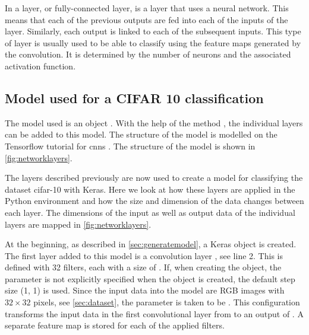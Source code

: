 {In a layer, or fully-connected layer, is a layer that uses a neural network. This means that each of the previous outputs are fed into each of the inputs of the layer. Similarly, each output is linked to each of the subsequent inputs. This type of layer is usually used to be able to classify using the feature maps generated by the convolution.  \cite{Keras:2020b} It is determined by the number of neurons and the associated activation function.



\subsection{Model used for a CIFAR 10 classification}\label{sec:usedmodel}

The model used is an object . With the help of the method , the individual layers can be added to this model. The structure of the model is modelled on the Tensorflow tutorial for \acp{cnn} \cite{GoogleTensorFlowCNN:2020}. The structure of the model is shown in \cref{fig:networklayers}.

The layers described previously are now used to create a model for classifying the dataset \ac{cifar}-10 with Keras. Here we look at how these layers are applied in the Python environment and how the size and dimension of the data changes between each layer. The dimensions of the input as well as output data of the individual layers are mapped in \cref{fig:networklayers}.


At the beginning, as described in \cref{sec:generatemodel}, a Keras object  is created. The first layer added to this model is a convolution layer , see line 2. This is defined with 32 filters, each with a size of . If, when creating the object, the parameter  is not explicitly specified when the object is created, the default step size (1, 1) is used. Since the input data into the model are RGB images with $32 \times 32$ pixels, see \cref{sec:dataset}, the parameter  is taken to be . This configuration transforms the input data in the first convolutional layer from  to an output of . A separate feature map is stored for each of the applied filters.

}
